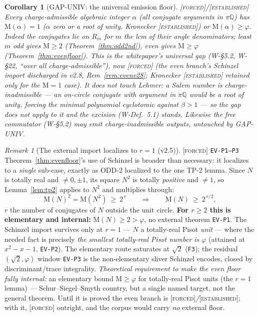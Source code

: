 \documentclass[11pt]{article}
\newcommand{\tagF}{\textcolor{cF}{\textsc{[forced]}}}
\newcommand{\tagE}{\textcolor{cE}{\textsc{[established]}}}
\newcommand{\hx}[1]{\textcolor{cC}{\footnotesize\texttt{#1}}}
\newcommand{\Q}{\mathbb{Q}}
\newcommand{\gp}{\varphi}
\newcommand{\M}{\mathrm{M}}
\theoremstyle{plain}
\newtheorem{corollary}[theorem]{Corollary}
\theoremstyle{definition}
\theoremstyle{remark}
\newtheorem{remark}[theorem]{Remark}
\begin{document}
\begin{corollary}[GAP-UNIV: the universal emission floor]\label{cor:gapuniv}\tagF{}/\tagE{}
Every charge-admissible algebraic integer $\alpha$ (all conjugate arguments in
$\pi\Q$) has $\M(\alpha)=1$ ($\alpha$ zero or a root of unity, Kronecker \tagE{})
or $\M(\alpha)\ge\gp$. Indeed the conjugates lie on $R_m$ for $m$ the lcm of their
angle denominators; least $m$ odd gives $\M\ge2$ (Theorem~\ref{thm:odd2nd}), even
gives $\M\ge\gp$ (Theorem~\ref{thm:evenfloor}). This is the whitepaper's universal
gap (W-\S5.2, W-\S22, ``over all charge-admissible''), now \tagF{} (the even
branch's Schinzel import discharged in v2.8, Rem~\ref{rem:evenv28}; Kronecker
\tagE{} retained only for the $\M=1$ case).
\emph{It does not touch Lehmer:} a Salem number is charge-\emph{inadmissible} ---
an on-circle conjugate with argument in $\pi\Q$ would be a root of unity, forcing
the minimal polynomial cyclotomic against $\beta>1$ --- so the gap does not apply
to it and the excision (W-Def.\ 5.1) stands. Likewise the free commutator
(W-\S5.2) may emit charge-inadmissible outputs, untouched by GAP-UNIV.
\end{corollary}

\begin{remark}[The external import localizes to $r=1$ (v2.5)]\label{rem:evenlocalize}\tagF{} \hx{EV-P1--P3}
Theorem~\ref{thm:evenfloor}'s use of Schinzel is broader than necessary: it
localizes to a \emph{single} sub-case, exactly as ODD-2 localized to the one TP-2
lemma. Since $N$ is totally real and $\ne0,\pm1$, its square $N^2$ is totally
\emph{positive} and $\ne1$, so Lemma~\ref{lem:tp2} applies to $N^2$ and multiplies
through:
\[
\M(N)^2=\M(N^2)\ \ge\ 2^{\,r}
\qquad\Longrightarrow\qquad
\M(N)\ \ge\ 2^{\,r/2},
\]
$r$ the number of conjugates of $N$ outside the unit circle. \textbf{For
$r\ge2$ this is elementary and internal:} $\M(N)\ge2>\gp$, no external theorem
\hx{EV-P1}. The Schinzel import survives only at $r=1$ --- $N$ a totally-real
Pisot \emph{unit} --- where the needed fact is precisely \emph{the smallest
totally-real Pisot number is $\gp$} (attained at $x^2-x-1$, \hx{EV-P2}). The
elementary route saturates at $\sqrt2$ (\hx{F3}); the residual $(\sqrt2,\gp)$
window \hx{EV-P3} is the non-elementary sliver Schinzel encodes, closed by
discriminant/trace integrality. \emph{Theoretical requirement to make the even
floor fully internal:} an elementary bound $\M\ge\gp$ for totally-real Pisot units
(the $r=1$ lemma) --- Schur--Siegel--Smyth country, but a single named target, not
the general theorem. Until it is proved the even branch is
\tagF{}\emph{/}\tagE{}; with it, \tagF{} outright, and the corpus would carry
\emph{no} external floor.
\end{remark}
\end{document}
